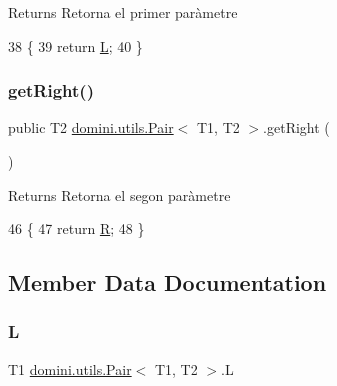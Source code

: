 \begin{DoxyReturn}{Returns}
Retorna el primer paràmetre 
\end{DoxyReturn}

\begin{DoxyCode}
38                         \{
39         \textcolor{keywordflow}{return} \hyperlink{classdomini_1_1utils_1_1Pair_a276a0eee9fa97fc27b37fab887f07cea}{L};
40     \}
\end{DoxyCode}
\mbox{\label{classdomini_1_1utils_1_1Pair_a0dca94eb1a43952258bebe1dca4c84e9}} 
\subsubsection{\texorpdfstring{get\+Right()}{getRight()}}
{\footnotesize\ttfamily public T2 \hyperlink{classdomini_1_1utils_1_1Pair}{domini.\+utils.\+Pair}$<$ T1, T2 $>$.get\+Right (\begin{DoxyParamCaption}{ }\end{DoxyParamCaption})\hspace{0.3cm}{\ttfamily [inline]}}

\begin{DoxyReturn}{Returns}
Retorna el segon paràmetre 
\end{DoxyReturn}

\begin{DoxyCode}
46                          \{
47         \textcolor{keywordflow}{return} \hyperlink{classdomini_1_1utils_1_1Pair_aebf54d48000999b84e5e24a2c62088d4}{R};
48     \}
\end{DoxyCode}


\subsection{Member Data Documentation}
\mbox{\label{classdomini_1_1utils_1_1Pair_a276a0eee9fa97fc27b37fab887f07cea}} 
\subsubsection{\texorpdfstring{L}{L}}
{\footnotesize\ttfamily T1 \hyperlink{classdomini_1_1utils_1_1Pair}{domini.\+utils.\+Pair}$<$ T1, T2 $>$.L}



